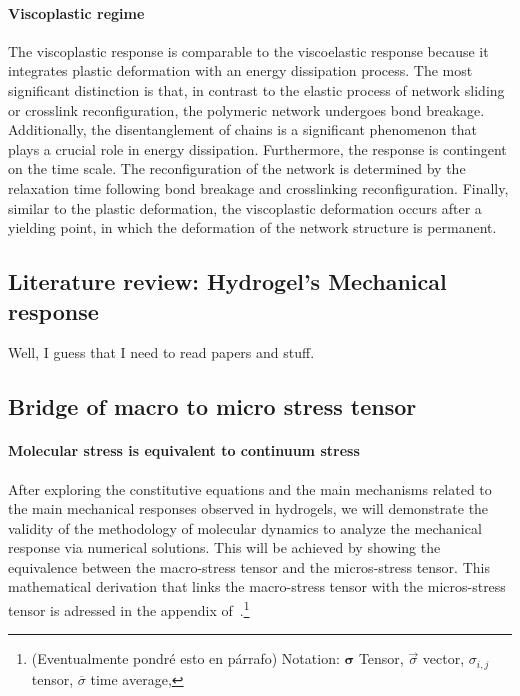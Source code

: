 \paragraph{Viscoplastic regime} The viscoplastic response is comparable to the viscoelastic response because it integrates plastic deformation with an energy dissipation process.
The most significant distinction is that, in contrast to the elastic process of network sliding or crosslink reconfiguration, the polymeric network undergoes bond breakage.
Additionally, the disentanglement of chains is a significant phenomenon that plays a crucial role in energy dissipation.
Furthermore, the response is contingent on the time scale. 
The reconfiguration of the network is determined by the relaxation time following bond breakage and crosslinking reconfiguration.
Finally, similar to the plastic deformation, the viscoplastic deformation occurs after a yielding point, in which the deformation of the network structure is permanent.


\subsection{Literature review: Hydrogel's Mechanical response}

Well, I guess that I need to read papers and stuff\citep{bouzidElasticallyDrivenIntermittent2017}.

\subsection{Bridge of macro to micro stress tensor}

\paragraph{Molecular stress is equivalent to continuum stress} After exploring the constitutive equations and the main mechanisms related to the main mechanical responses observed in hydrogels, we will demonstrate the validity of the methodology of molecular dynamics to analyze the mechanical response via numerical solutions. 
This will be achieved by showing the equivalence between the macro-stress tensor and the micros-stress tensor.
This mathematical derivation that links the macro-stress tensor with the micros-stress tensor is adressed in the appendix of~\citep{admalUnifiedInterpretationStress2010}.\footnote{(Eventualmente pondré esto en párrafo) Notation:
    $\bm{\sigma}$ Tensor, $\vec{\sigma}$ vector, $\sigma_{i,j}$ tensor, $\overline{\sigma}$ time average, 
}

